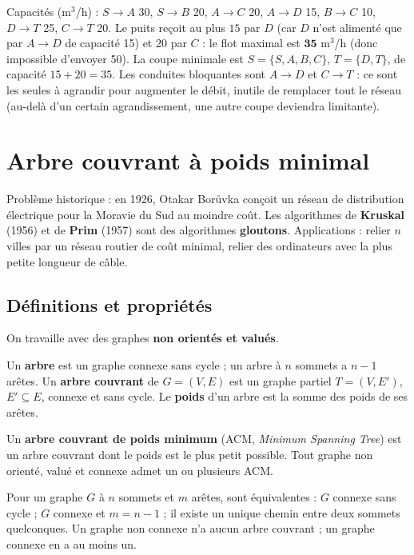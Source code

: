 \documentclass[11pt,a4paper]{article}
\begin{document}
\begin{exemple}
Capacités (m$^3$/h) : $S\to A$ 30, $S\to B$ 20, $A\to C$ 20, $A\to D$ 15, $B\to C$ 10, $D\to T$ 25, $C\to T$ 20.
Le puits reçoit au plus $15$ par $D$ (car $D$ n'est alimenté que par $A\to D$ de capacité 15) et $20$ par $C$ : le flot maximal est $\mathbf{35}$ m$^3$/h (donc impossible d'envoyer 50). La coupe minimale est $S=\{S,A,B,C\}$, $T=\{D,T\}$, de capacité $15+20=35$. Les conduites bloquantes sont $A\to D$ et $C\to T$ : ce sont les seules à agrandir pour augmenter le débit, inutile de remplacer tout le réseau (au-delà d'un certain agrandissement, une autre coupe deviendra limitante).
\end{exemple}

\section{Arbre couvrant à poids minimal}
Problème historique : en 1926, Otakar Borůvka conçoit un réseau de distribution électrique pour la Moravie du Sud au moindre coût. Les algorithmes de \textbf{Kruskal} (1956) et de \textbf{Prim} (1957) sont des algorithmes \textbf{gloutons}. Applications : relier $n$ villes par un réseau routier de coût minimal, relier des ordinateurs avec la plus petite longueur de câble.

\subsection{Définitions et propriétés}
On travaille avec des graphes \textbf{non orientés et valués}.
\begin{definition}
Un \textbf{arbre} est un graphe connexe sans cycle ; un arbre à $n$ sommets a $n-1$ arêtes. Un \textbf{arbre couvrant} de $G=(V,E)$ est un graphe partiel $T=(V,E')$, $E'\subseteq E$, connexe et sans cycle. Le \textbf{poids} d'un arbre est la somme des poids de ses arêtes.
\end{definition}
\begin{definition}[ACM]
Un \textbf{arbre couvrant de poids minimum} (ACM, \emph{Minimum Spanning Tree}) est un arbre couvrant dont le poids est le plus petit possible. Tout graphe non orienté, valué et connexe admet un ou plusieurs ACM.
\end{definition}

\begin{retenir}
Pour un graphe $G$ à $n$ sommets et $m$ arêtes, sont équivalentes : $G$ connexe sans cycle ; $G$ connexe et $m=n-1$ ; il existe un unique chemin entre deux sommets quelconques. Un graphe non connexe n'a aucun arbre couvrant ; un graphe connexe en a au moins un.
\end{retenir}
\end{document}
